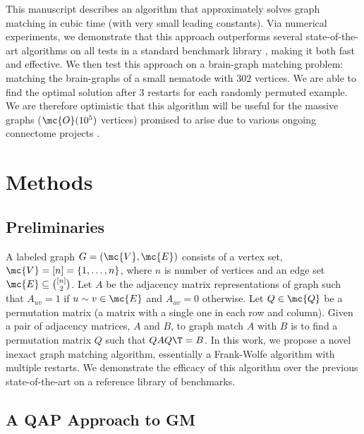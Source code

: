 \documentclass[10pt,journal,cspaper,compsoc]{IEEEtran}
\begin{document}
This manuscript describes an algorithm that approximately solves graph matching in cubic time (with very small leading constants).  Via numerical experiments, we demonstrate that this approach outperforms several state-of-the-art algorithms on all tests in a standard benchmark library \cite{Burkard1997}, making it both fast and effective. We then test this approach on a brain-graph matching problem: matching the brain-graphs of a small nematode with $302$ vertices.  We are able to find the optimal solution after $3$ restarts for each randomly permuted example.  We are therefore optimistic that this algorithm will be useful for the massive graphs ($\mc{O}(10^5)$ vertices)  promised to arise due to various ongoing connectome projects \cite{HCP,OCP}.










\section{Methods} %
\label{sec:methods}


\subsection{Preliminaries} %
\label{sub:preliminaries}


A labeled graph $G=(\mc{V},\mc{E})$ consists of a vertex set, $\mc{V}=[n]=\{1,\ldots, n\}$, where $n$ is number of vertices and an edge set $\mc{E} \subseteq \binom{[n]}{2}$.  Let $A$ be the adjacency matrix representations of graph such that $A_{uv}=1$ if $u \sim v \in \mc{E}$ and $A_{uv}=0$ otherwise.  Let $Q \in \mc{Q}$ be a permutation matrix (a matrix with a single one in each row and column).  Given a pair of adjacency matrices, $A$ and $B$, to graph match $A$ with $B$ is to find a permutation matrix $Q$ such that $QAQ\T=B$. In this work, we propose a novel inexact graph matching algorithm, essentially a Frank-Wolfe algorithm with multiple restarts.  We demonstrate the efficacy of this algorithm over the previous state-of-the-art on a reference library of benchmarks.  

\subsection{A QAP Approach to GM} %
\label{ssub:graph_matching}
\end{document}
